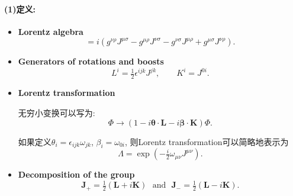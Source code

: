 \paragraph*{(1)定义:}
\begin{itemize}
  \item \textbf{Lorentz algebra}
        \begin{equation}
          [J^{\mu\nu}, J^{\rho\sigma}] = i(g^{\nu\rho}J^{\mu\sigma} - g^{\mu\rho}J^{\nu\sigma} - g^{\nu\sigma}J^{\mu\rho} + g^{\mu\sigma}J^{\nu\rho}).
        \end{equation}
  \item \textbf{Generators of rotations and boosts}
        \begin{equation}
          L^i = \tfrac{1}{2}\epsilon^{ijk}J^{jk},\qquad K^i = J^{0i}.
        \end{equation}
  \item \textbf{Lorentz transformation}

        无穷小变换可以写为:
        \begin{equation}
          \Phi \rightarrow (1 - i\bm{\theta}\cdot\mathbf{L} - i\bm{\beta}\cdot\mathbf{K})\Phi.
        \end{equation}

        如果定义$\theta_i = \epsilon_{ijk}\omega_{jk}$, $\beta_i = \omega_{0i}$, 则Lorentz transformation可以简略地表示为
        \begin{equation}
          \Lambda = \exp(-\tfrac{i}{2}\omega_{\mu\nu}J^{\mu\nu}).
        \end{equation}
  \item \textbf{Decomposition of the group}
        \begin{equation}
          \mathbf{J}_+ = \tfrac{1}{2}(\mathbf{L}+i\mathbf{K})\ \ \ \text{and}\ \ \ \mathbf{J}_- = \tfrac{1}{2}(\mathbf{L}-i\mathbf{K}).
        \end{equation}
\end{itemize}

